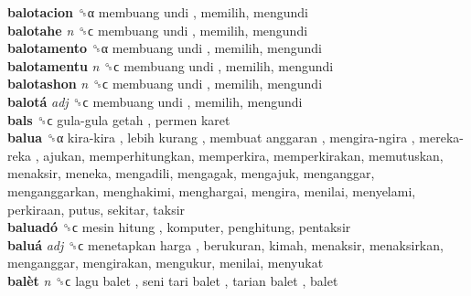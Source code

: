 \textbf{balotacion} ␝α   membuang undi , memilih, mengundi  \\
\textbf{balotahe} \emph{n}  ␝ϲ   membuang undi , memilih, mengundi  \\
\textbf{balotamento} ␝α   membuang undi , memilih, mengundi  \\
\textbf{balotamentu} \emph{n}  ␝ϲ   membuang undi , memilih, mengundi  \\
\textbf{balotashon} \emph{n}  ␝ϲ   membuang undi , memilih, mengundi  \\
\textbf{balotá} \emph{adj}  ␝ϲ   membuang undi , memilih, mengundi  \\
\textbf{bals} ␝ϲ   gula-gula getah ,  permen karet   \\
\textbf{balua} ␝α   kira-kira ,  lebih kurang ,  membuat anggaran ,  mengira-ngira ,  mereka-reka , ajukan, memperhitungkan, memperkira, memperkirakan, memutuskan, menaksir, meneka, mengadili, mengagak, mengajuk, menganggar, menganggarkan, menghakimi, menghargai, mengira, menilai, menyelami, perkiraan, putus, sekitar, taksir  \\
\textbf{baluadó} ␝ϲ   mesin hitung , komputer, penghitung, pentaksir  \\
\textbf{baluá} \emph{adj}  ␝ϲ   menetapkan harga , berukuran, kimah, menaksir, menaksirkan, menganggar, mengirakan, mengukur, menilai, menyukat  \\
\textbf{balèt} \emph{n}  ␝ϲ   lagu balet ,  seni tari balet ,  tarian balet , balet  \\
